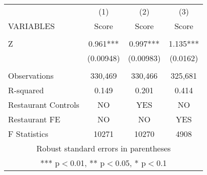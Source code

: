 \begin{tabular}{lccc} \hline
 & (1) & (2) & (3) \\
VARIABLES & Score & Score & Score \\ \hline
 &  &  &  \\
Z & 0.961*** & 0.997*** & 1.135*** \\
 & (0.00948) & (0.00983) & (0.0162) \\
 &  &  &  \\
Observations & 330,469 & 330,466 & 325,681 \\
R-squared & 0.149 & 0.201 & 0.414 \\
Restaurant Controls & NO & YES & NO \\
Restaurant FE & NO & NO & YES \\
 F Statistics & 10271 & 10270 & 4908 \\ \hline
\multicolumn{4}{c}{ Robust standard errors in parentheses} \\
\multicolumn{4}{c}{ *** p$<$0.01, ** p$<$0.05, * p$<$0.1} \\
\end{tabular}
